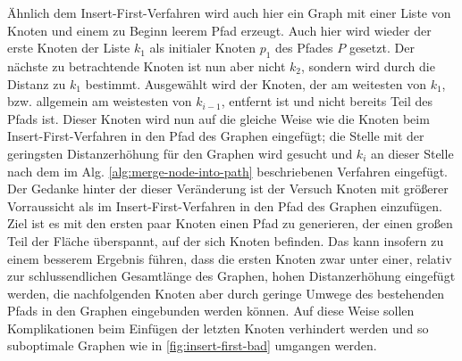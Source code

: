 
Ähnlich dem Insert-First-Verfahren wird auch hier ein Graph mit einer Liste von Knoten und einem zu Beginn leerem Pfad erzeugt.
Auch hier wird wieder der erste Knoten der Liste $k_1$ als initialer Knoten $p_1$ des Pfades $P$ gesetzt.
Der nächste zu betrachtende Knoten ist nun aber nicht $k_2$, sondern wird durch die Distanz zu $k_1$ bestimmt.
Ausgewählt wird der Knoten, der am weitesten von $k_1$, bzw. allgemein am weistesten von $k_{i-1}$, entfernt ist und nicht bereits Teil des Pfads ist.
Dieser Knoten wird nun auf die gleiche Weise wie die Knoten beim Insert-First-Verfahren in den Pfad des Graphen eingefügt; die Stelle mit der geringsten Distanzerhöhung für den Graphen wird gesucht und $k_i$ an dieser Stelle nach dem im \ac{Alg.} \vref{alg:merge-node-into-path} beschriebenen Verfahren eingefügt.\\
Der Gedanke hinter der dieser Veränderung ist der Versuch Knoten mit größerer Vorraussicht als im Insert-First-Verfahren in den Pfad des Graphen einzufügen.
Ziel ist es mit den ersten paar Knoten einen Pfad zu generieren, der einen großen Teil der Fläche überspannt, auf der sich Knoten befinden.
Das kann insofern zu einem besserem Ergebnis führen, dass die ersten Knoten zwar unter einer, relativ zur schlussendlichen Gesamtlänge des Graphen, hohen Distanzerhöhung eingefügt werden, die nachfolgenden Knoten aber durch geringe Umwege des bestehenden Pfads in den Graphen eingebunden werden können.
Auf diese Weise sollen Komplikationen beim Einfügen der letzten Knoten verhindert werden und so suboptimale Graphen wie in \vref{fig:insert-first-bad} umgangen werden.

